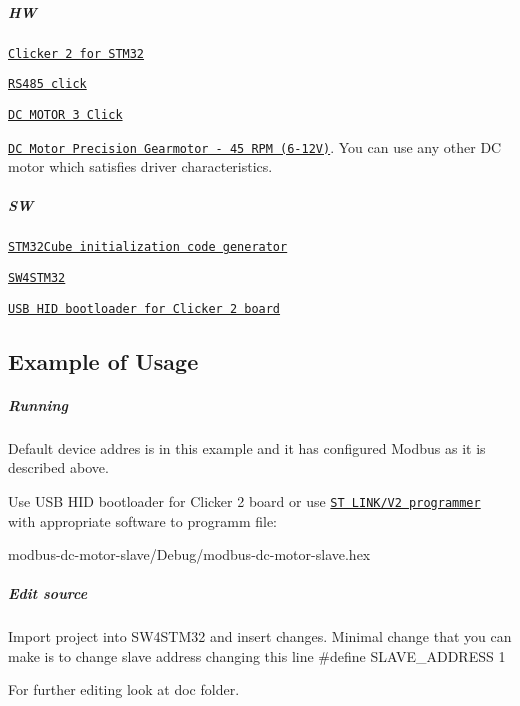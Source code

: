 \subparagraph*{HW}


\begin{DoxyItemize}
\item \href{https://www.mikroe.com/clicker-2-stm32f4}{\tt Clicker 2 for S\+T\+M32}
\item \href{https://www.mikroe.com/rs485-33v-click}{\tt R\+S485 click}
\item \href{https://www.mikroe.com/dc-motor-3-click}{\tt DC M\+O\+T\+OR 3 Click}
\item \href{https://www.sparkfun.com/products/retired/12514}{\tt DC Motor Precision Gearmotor -\/ 45 R\+PM (6-\/12V)}. You can use any other DC motor which satisfies driver characteristics.
\end{DoxyItemize}

\subparagraph*{SW}


\begin{DoxyItemize}
\item \href{https://www.st.com/en/development-tools/stm32cubemx.html}{\tt S\+T\+M32\+Cube initialization code generator}
\item \href{https://www.st.com/en/development-tools/sw4stm32.html}{\tt S\+W4\+S\+T\+M32}
\item \href{https://download.mikroe.com/examples/starter-boards/clicker-2/stm32f4/clicker-2-stm32f4-mikrobootloader-usb-hid-v130.zip}{\tt U\+SB H\+ID bootloader for Clicker 2 board}
\end{DoxyItemize}

\subsection*{Example of Usage}

\subparagraph*{Running}

Default device addres is {} in this example and it has configured Modbus as it is described above.

Use U\+SB H\+ID bootloader for Clicker 2 board or use \href{https://www.st.com/en/development-tools/st-link-v2.html}{\tt ST L\+I\+N\+K/\+V2 programmer} with appropriate software to programm file\+:

{\ttfamily modbus-\/dc-\/motor-\/slave/\+Debug/modbus-\/dc-\/motor-\/slave.\+hex}

\subparagraph*{Edit source}

Import project into S\+W4\+S\+T\+M32 and insert changes. Minimal change that you can make is to change slave address changing this line {\ttfamily \#define S\+L\+A\+V\+E\+\_\+\+A\+D\+D\+R\+E\+SS 1}

For further editing look at {\ttfamily doc} folder. 